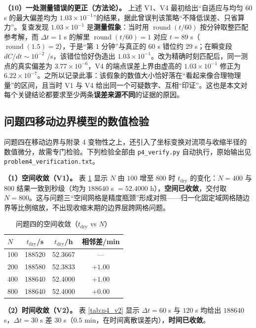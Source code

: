 \textbf{（10）一处测量错误的更正（方法论）。} 上述 V1、V4 最初给出“自适应与均匀 $60$ s 的最大偏差均为 $1.03\times10^{-1}$”的结果，据此曾误判该策略“不降低误差、只省算力”。复查发现 $1.03\times10^{-1}$ 是\textbf{测量假象}：当时用 $\operatorname{round}(t/60)$ 按分钟取整匹配参考解，而 $\Delta t=1$ s 的解里 $\operatorname{round}(t/60)=1$ 对应 $t=89$ s（$\operatorname{round}(1.5)=2$），于是“第 $1$ 分钟”与真正的 $60$ s 错位约 $29$ s；在瞬变段 $dC/dt\sim10^{-2}$ /s，该错位恰好伪造出 $1.03\times10^{-1}$。改为精确时刻匹配后，同一测点的真实偏差为 $3.77\times10^{-6}$，V4 的端点误差上界由虚高的 $1.03\times10^{-1}$ 修正为 $6.22\times10^{-7}$。之所以记录此事：该假象的数值大小恰好落在“看起来像合理物理量”的区间，且当时 V1 与 V4 给出同一个可疑数字、互相“印证”。这也是本文对每个关键结论都要求至少两条\textbf{误差来源不同}的证据的原因。

\subsection{问题四移动边界模型的数值检验}
\label{sec:p4_verify}

问题四在移动边界与附录 4 变物性之上，还引入了坐标变换对流项与收缩半径的数值微分，故需专门检验。下列检验全部由 \texttt{p4\_verify.py} 自动执行，原始输出见 \texttt{problem4\_verification.txt}。

\textbf{（1）空间收敛（V1）。} 表 \ref{tab:p4_v1} 显示 $N$ 由 $100$ 增至 $800$ 时 $t_{\text{dry}}$ 的变化：$N=400$ 与 $800$ 结果一致到秒级（均为 $188640$ s $=52.4000$ h），\textbf{空间已收敛}，交付取 $N=800$。这与问题三“空间网格是精度瓶颈”形成对照——归一化固定域网格随边界等比例缩放，不出现收缩末期的边界层跨网格问题。

\begin{table}[H]
  \centering
  \caption{问题四的空间收敛（$t_{\text{dry}}$ vs $N$）}
  \label{tab:p4_v1}
  \begin{tabular}{lccc}
    \toprule
    $N$ & $t_{\text{dry}}$/s & $t_{\text{dry}}$/h & 相邻差/min \\
    \midrule
    100 & 188520 & 52.3667 & --- \\
    200 & 188580 & 52.3833 & $+1.00$ \\
    400 & 188640 & 52.4000 & $+1.00$ \\
    800 & 188640 & 52.4000 & $+0.00$ \\
    \bottomrule
  \end{tabular}
\end{table}

\textbf{（2）时间收敛（V2）。} 表 \ref{tab:p4_v2} 显示 $\Delta t=60$ s 与 $120$ s 均给出 $188640$ s，$\Delta t=30$ s 差 $30$ s（$0.5$ min，在时间离散误差内），\textbf{时间已收敛}。

